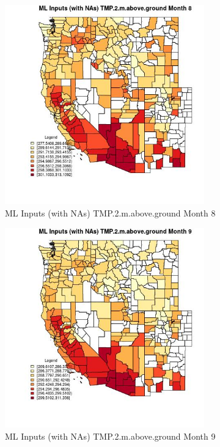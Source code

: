 \begin{figure} 
\centering  
\includegraphics[width=0.77\textwidth]{Code_Outputs/Report_ML_input_PM25_Step4_part_f_de_duplicated_aveswNAs_CountyTMP2mabovegroundmedianMonth8.jpg} 
\caption{\label{fig:Report_ML_input_PM25_Step4_part_f_de_duplicated_aveswNAsCountyTMP2mabovegroundmedianMonth8}ML Inputs (with NAs) TMP.2.m.above.ground Month 8} 
\end{figure} 
 

\begin{figure} 
\centering  
\includegraphics[width=0.77\textwidth]{Code_Outputs/Report_ML_input_PM25_Step4_part_f_de_duplicated_aveswNAs_CountyTMP2mabovegroundmedianMonth9.jpg} 
\caption{\label{fig:Report_ML_input_PM25_Step4_part_f_de_duplicated_aveswNAsCountyTMP2mabovegroundmedianMonth9}ML Inputs (with NAs) TMP.2.m.above.ground Month 9} 
\end{figure} 
 

